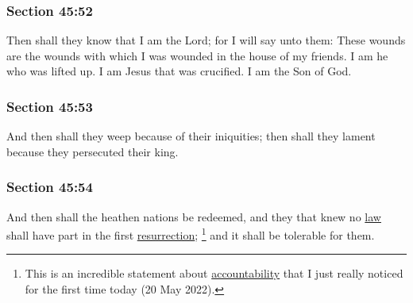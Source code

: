 	\subsubsection{Section 45:52} %
		\label{DC45-52}

		Then shall they know that I am the Lord; for I will say unto them: These wounds are the wounds with which I was wounded in the house of my friends.  I am he who was lifted up.  I am Jesus that was crucified.  I am the Son of God.


	\subsubsection{Section 45:53} %
		\label{DC45-53}

		And then shall they weep because of their iniquities; then shall they lament because they persecuted their king.


	\subsubsection{Section 45:54} %
		\label{DC45-54}

		And then shall the heathen nations be redeemed, and they that knew no \hyperref[LAW]{law} shall have part in the first \hyperref[RESURRECTION]{resurrection};%
			\footnote{%
				This is an incredible statement about \hyperref[ACCOUNTABILITY]{accountability} that I just really noticed for the first time today (20 May 2022).
				}
		and it shall be tolerable for them.

